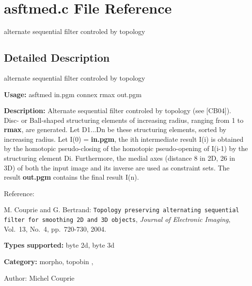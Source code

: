 \section{asftmed.c File Reference}
\label{asftmed_8c}
alternate sequential filter controled by topology 



\subsection{Detailed Description}
alternate sequential filter controled by topology 

{\bf Usage:} asftmed in.pgm connex rmax out.pgm

{\bf Description:} Alternate sequential filter controled by topology (see [CB04]). Disc- or Ball-shaped structuring elements of increasing radius, ranging from 1 to {\bf rmax}, are generated. Let D1...Dn be these structuring elements, sorted by increasing radius. Let I(0) = {\bf in.pgm}, the ith intermediate result I(i) is obtained by the homotopic pseudo-closing of the homotopic pseudo-opening of I(i-1) by the structuring element Di. Furthermore, the medial axes (distance 8 in 2D, 26 in 3D) of both the input image and its inverse are used as constraint sets. The result {\bf out.pgm} contains the final result I(n).

Reference:\par
 [CB04] M. Couprie and G. Bertrand: {\tt Topology preserving alternating sequential filter for smoothing 2D and 3D objects}, {\em  Journal of Electronic Imaging\/}, Vol.~13, No.~4, pp.~720-730, 2004.

{\bf Types supported:} byte 2d, byte 3d

{\bf Category:} morpho, topobin ,

\begin{Desc}
\item[Author:]Michel Couprie \end{Desc}
